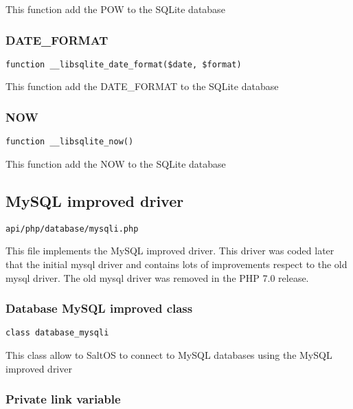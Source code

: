 \documentclass[a4paper]{article}
\begin{document}
This function add the POW to the SQLite database

\hypertarget{toc315}{}
\subsubsection{DATE\_FORMAT}

\begin{lstlisting}
function __libsqlite_date_format($date, $format)
\end{lstlisting}

This function add the DATE\_FORMAT to the SQLite database

\hypertarget{toc316}{}
\subsubsection{NOW}

\begin{lstlisting}
function __libsqlite_now()
\end{lstlisting}

This function add the NOW to the SQLite database

\hypertarget{toc317}{}
\subsection{MySQL improved driver}

\begin{lstlisting}
api/php/database/mysqli.php
\end{lstlisting}

This file implements the MySQL improved driver. This driver was coded later that the initial
mysql driver and contains lots of improvements respect to the old mysql driver. The old mysql
driver was removed in the PHP 7.0 release.

\hypertarget{toc318}{}
\subsubsection{Database MySQL improved class}

\begin{lstlisting}
class database_mysqli
\end{lstlisting}

This class allow to SaltOS to connect to MySQL databases using the MySQL improved driver

\hypertarget{toc319}{}
\subsubsection{Private link variable}
\end{document}
